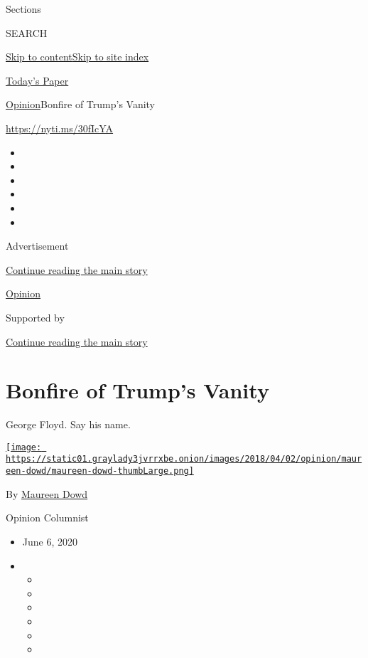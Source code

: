 Sections

SEARCH

\protect\hyperlink{site-content}{Skip to
content}\protect\hyperlink{site-index}{Skip to site index}

\href{https://myaccount.nytimes3xbfgragh.onion/auth/login?response_type=cookie\&client_id=vi}{}

\href{https://www.nytimes3xbfgragh.onion/section/todayspaper}{Today's
Paper}

\href{/section/opinion}{Opinion}\textbar{}Bonfire of Trump's Vanity

\url{https://nyti.ms/30fIcYA}

\begin{itemize}
\item
\item
\item
\item
\item
\item
\end{itemize}

Advertisement

\protect\hyperlink{after-top}{Continue reading the main story}

\href{/section/opinion}{Opinion}

Supported by

\protect\hyperlink{after-sponsor}{Continue reading the main story}

\hypertarget{bonfire-of-trumps-vanity}{%
\section{Bonfire of Trump's Vanity}\label{bonfire-of-trumps-vanity}}

George Floyd. Say his name.

\href{https://www.nytimes3xbfgragh.onion/by/maureen-dowd}{\texttt{[image: https://static01.graylady3jvrrxbe.onion/images/2018/04/02/opinion/maureen-dowd/maureen-dowd-thumbLarge.png]}}

By \href{https://www.nytimes3xbfgragh.onion/by/maureen-dowd}{Maureen
Dowd}

Opinion Columnist

\begin{itemize}
\item
  June 6, 2020
\item
  \begin{itemize}
  \item
  \item
  \item
  \item
  \item
  \item
  \end{itemize}
\end{itemize}

